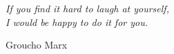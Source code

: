 \begin{dedication}

{%
{

\big

\textit{If you find it hard to laugh at yourself,\\ 
I would be happy to do it for you.}

Groucho Marx
}
}
\end{dedication}


